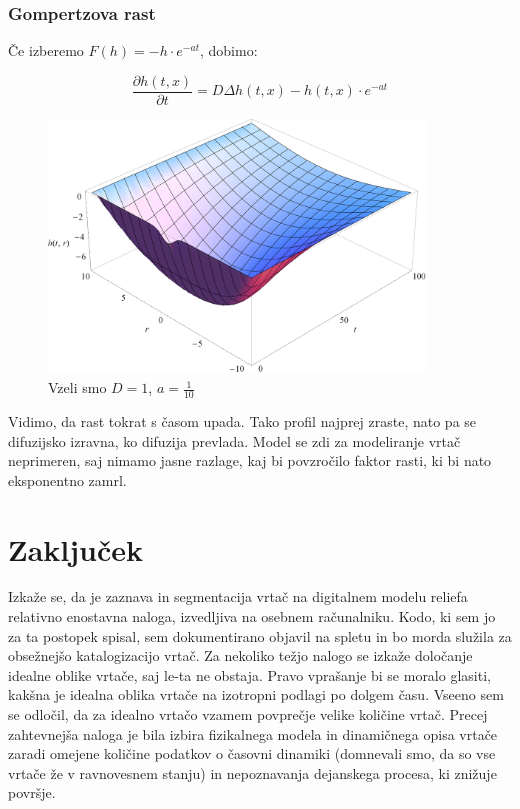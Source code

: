 \documentclass[a4paper, oneside, 12pt]{book}
\begin{document}
          \subsection{Gompertzova rast}

          Če izberemo $F(h) = - h \cdot e^{-a t}$, dobimo:

            \begin{equation}
              \frac{ \partial h(t,x) }{ \partial t} = D \Delta h(t,x) - h(t,x) \cdot e^{-a t}
              \label{difuzija-gompertzova-rast}
            \end{equation}

            \begin{figure}[H]
              \begin{center}
                \includegraphics[width=10cm]{slike/difuzija-gompertzova-rast2}
              \end{center}
              \caption{Vzeli smo $D=1$, $a=\frac{1}{10}$}
              \label{fig:difuzija-gompertzova-rast}
            \end{figure}

            Vidimo, da rast tokrat s časom upada. Tako profil najprej zraste, nato pa se difuzijsko izravna, ko difuzija prevlada.
            Model se zdi za modeliranje vrtač neprimeren, saj nimamo jasne razlage, kaj bi povzročilo faktor rasti, ki bi nato eksponentno zamrl.


            \chapter{Zaključek}

            Izkaže se, da je zaznava in segmentacija vrtač na digitalnem modelu reliefa relativno enostavna naloga, izvedljiva na osebnem računalniku. Kodo, ki sem jo za ta postopek spisal, sem dokumentirano objavil na spletu in bo morda služila za obsežnejšo katalogizacijo vrtač.
Za nekoliko težjo nalogo se izkaže določanje idealne oblike vrtače, saj le-ta ne obstaja. Pravo vprašanje bi se moralo glasiti, kakšna je idealna oblika vrtače na izotropni podlagi po dolgem času. Vseeno sem se odločil, da za idealno vrtačo vzamem povprečje velike količine vrtač.
Precej zahtevnejša naloga je bila izbira fizikalnega modela in dinamičnega opisa vrtače zaradi omejene količine podatkov o časovni dinamiki (domnevali smo, da so vse vrtače že v ravnovesnem stanju) in nepoznavanja dejanskega procesa, ki znižuje površje.
\end{document}
